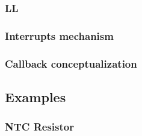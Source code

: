 \documentclass[../main.tex]{subfiles}
\begin{document}
\subsubsection{LL}
\subsubsection{Interrupts mechanism}
\subsubsection{Callback conceptualization}




\subsection{Examples}

\subsubsection{NTC Resistor}
\end{document}

